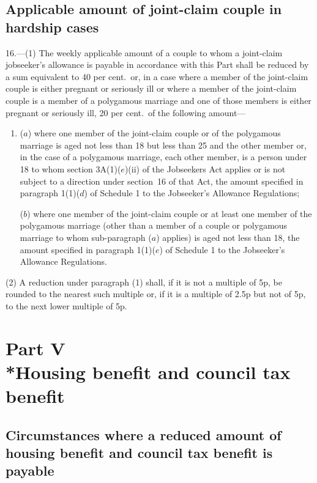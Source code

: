 \documentclass[12pt,a4paper]{article}
\begin{document}
\subsection[16. Applicable amount of joint-claim couple in hardship cases]{Applicable amount of joint-claim couple in hardship cases}

16.---(1)  The weekly applicable amount of a couple to whom a joint-claim jobseeker’s allowance is payable in accordance with this Part shall be reduced by a sum equivalent to 40 per cent.\ or, in a case where a member of the joint-claim couple is either pregnant or seriously ill or where a member of the joint-claim couple is a member of a polygamous marriage and one of those members is either pregnant or seriously ill, 20 per cent.\ of the following amount—
\begin{enumerate}\item[]
($a$) where one member of the joint-claim couple or of the polygamous marriage is aged not less than 18 but less than 25 and the other member or, in the case of a polygamous marriage, each other member, is a person under 18 to whom section 3A(1)($e$)(ii)  of the Jobseekers Act applies or is not subject to a direction under section~16 of that Act, the amount specified in paragraph 1(1)($d$)  of Schedule 1 to the Jobseeker’s Allowance Regulations;

($b$) where one member of the joint-claim couple or at least one member of the polygamous marriage (other than a member of a couple or polygamous marriage to whom sub-paragraph ($a$)  applies) is aged not less than 18, the amount specified in paragraph 1(1)($e$)  of Schedule 1 to the Jobseeker’s Allowance Regulations.
\end{enumerate}

(2) A reduction under paragraph (1) shall, if it is not a multiple of 5p, be rounded to the nearest such multiple or, if it is a multiple of 2$.$5p but not of 5p, to the next lower multiple of 5p.

\section[Part V --- Housing benefit and council tax benefit]{Part V\\*Housing benefit and council tax benefit}

\renewcommand\parthead{--- Part V}

\subsection[17. Circumstances where a reduced amount of housing benefit and council tax benefit is payable]{Circumstances where a reduced amount of housing benefit and council tax benefit is payable}
\end{document}
